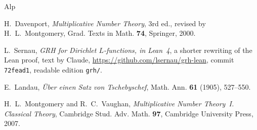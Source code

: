 \documentclass[reqno]{amsart}
\theoremstyle{definition}
\theoremstyle{plain}
\begin{document}
\begin{thebibliography}{Alp}

H.~Davenport, \emph{Multiplicative Number Theory}, 3rd ed., revised by H.~L.~Montgomery, Grad. Texts in Math. \textbf{74}, Springer, 2000.

 L.~Sernau, \emph{GRH for Dirichlet \(L\)-functions, in Lean~4}, a shorter rewriting of the Lean proof, text by Claude, \url{https://github.com/lsernau/grh-lean}, commit \texttt{72fead1}, readable edition \texttt{grh/}.

E.~Landau, \emph{\"Uber einen Satz von Tschebyschef}, Math. Ann. \textbf{61} (1905), 527--550.

H.~L.~Montgomery and R.~C.~Vaughan, \emph{Multiplicative Number Theory~I. Classical Theory}, Cambridge Stud. Adv. Math. \textbf{97}, Cambridge University Press, 2007.

\end{thebibliography}
\end{document}
